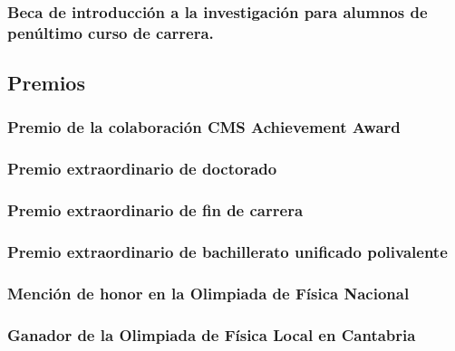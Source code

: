 \documentclass[a4paper, 11pt, twoside, openright]{report}
\begin{document}
\subsubsection{Beca de introducción a la investigación para alumnos de penúltimo curso de carrera.}



\subsection{Premios}


\subsubsection{Premio de la colaboración CMS Achievement Award}


\subsubsection{Premio extraordinario de doctorado}


\subsubsection{Premio extraordinario de fin de carrera}


\subsubsection{Premio extraordinario de bachillerato unificado polivalente}


\subsubsection{Mención de honor en la Olimpiada de Física Nacional}


\subsubsection{Ganador de la Olimpiada de Física Local en Cantabria}

\end{document}
